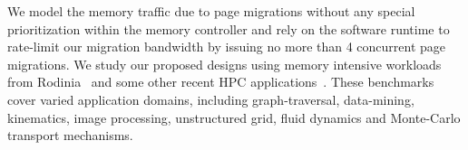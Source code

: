 We model the memory traffic due to page migrations without any special
prioritization within the memory controller and rely on the software runtime to
rate-limit our migration bandwidth by issuing no more than 4 concurrent page
migrations.  We study our proposed designs using memory intensive workloads from
Rodinia~\cite{Che2009} and some other recent HPC
applications~\cite{comd,cns,minife,xsbench}. These benchmarks cover varied
application domains, including graph-traversal, data-mining, kinematics, image
processing, unstructured grid, fluid dynamics and Monte-Carlo transport
mechanisms.
